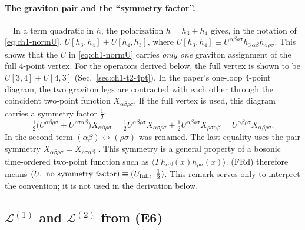 \paragraph{The graviton pair and the ``symmetry factor''.} \tD\ \tA\ In a term
quadratic in $h$, the polarization $h=h_3+h_4$ gives, in the notation of
\eqref{eq:ch1-normU}, $U[h_3,h_4]+U[h_4,h_3]$, where
$U[h_3,h_4]\equiv U^{\alpha\beta\rho\sigma}h_{3\,\alpha\beta}h_{4\,\rho\sigma}$.
This shows that the $U$ in \eqref{eq:ch1-normU} carries \emph{only one} graviton
assignment of the full 4-point vertex. For the operators derived below, the
full vertex is shown to be $U[3,4]+U[4,3]$ (Sec.~\ref{sec:ch1-t2-4pt}). In the
paper's one-loop 4-point diagram, the two graviton legs are contracted with each
other through the coincident two-point function $X_{\alpha\beta\rho\sigma}$. If
the full vertex is used, this diagram carries a symmetry factor $\tfrac12$:
\begin{equation}
\tfrac12\big(U^{\alpha\beta\rho\sigma}+U^{\rho\sigma\alpha\beta}\big)X_{\alpha\beta\rho\sigma}
=\tfrac12U^{\alpha\beta\rho\sigma}X_{\alpha\beta\rho\sigma}+\tfrac12U^{\alpha\beta\rho\sigma}X_{\rho\sigma\alpha\beta}
=U^{\alpha\beta\rho\sigma}X_{\alpha\beta\rho\sigma}.
\label{eq:ch1-symfactor}
\end{equation}
In the second term $(\alpha\beta)\leftrightarrow(\rho\sigma)$ was renamed. The
last equality uses the pair symmetry $X_{\alpha\beta\rho\sigma}=X_{\rho\sigma\alpha\beta}$
\tA. This symmetry is a general property of a bosonic time-ordered two-point
function such as $\langle T\,h_{\alpha\beta}(x)h_{\rho\sigma}(x)\rangle$. (FRd)
therefore means
$(U,\ \text{no symmetry factor})\equiv(U_{\rm full},\ \tfrac12)$. This remark
serves only to interpret the convention; it is not used in the derivation
below.

\subsection{\texorpdfstring{$\mathcal L^{(1)}$ and $\mathcal L^{(2)}$}{L(1) and L(2)} from (E6)}
\label{sec:ch1-t2-L12}


